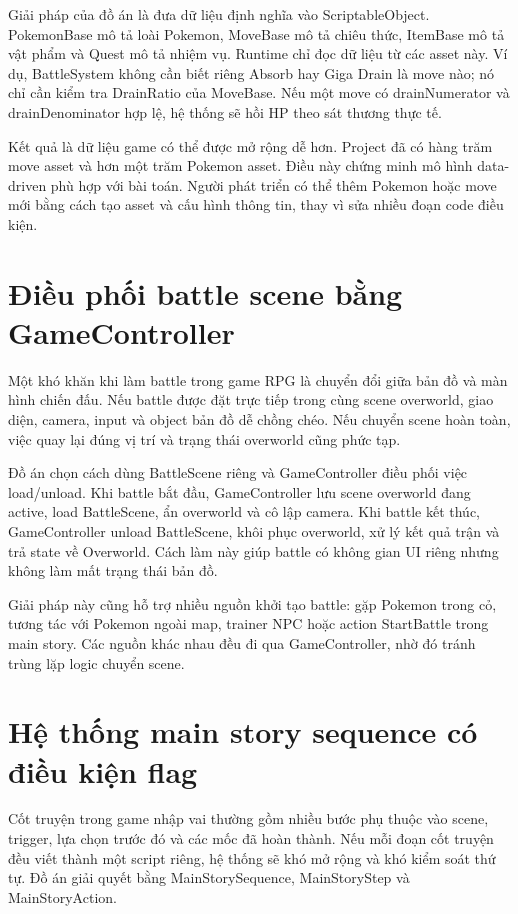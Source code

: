 Giải pháp của đồ án là đưa dữ liệu định nghĩa vào ScriptableObject. PokemonBase mô tả loài Pokemon, MoveBase mô tả chiêu thức, ItemBase mô tả vật phẩm và Quest mô tả nhiệm vụ. Runtime chỉ đọc dữ liệu từ các asset này. Ví dụ, BattleSystem không cần biết riêng Absorb hay Giga Drain là move nào; nó chỉ cần kiểm tra DrainRatio của MoveBase. Nếu một move có drainNumerator và drainDenominator hợp lệ, hệ thống sẽ hồi HP theo sát thương thực tế.

Kết quả là dữ liệu game có thể được mở rộng dễ hơn. Project đã có hàng trăm move asset và hơn một trăm Pokemon asset. Điều này chứng minh mô hình data-driven phù hợp với bài toán. Người phát triển có thể thêm Pokemon hoặc move mới bằng cách tạo asset và cấu hình thông tin, thay vì sửa nhiều đoạn code điều kiện.

\section{Điều phối battle scene bằng GameController}

Một khó khăn khi làm battle trong game RPG là chuyển đổi giữa bản đồ và màn hình chiến đấu. Nếu battle được đặt trực tiếp trong cùng scene overworld, giao diện, camera, input và object bản đồ dễ chồng chéo. Nếu chuyển scene hoàn toàn, việc quay lại đúng vị trí và trạng thái overworld cũng phức tạp.

Đồ án chọn cách dùng BattleScene riêng và GameController điều phối việc load/unload. Khi battle bắt đầu, GameController lưu scene overworld đang active, load BattleScene, ẩn overworld và cô lập camera. Khi battle kết thúc, GameController unload BattleScene, khôi phục overworld, xử lý kết quả trận và trả state về Overworld. Cách làm này giúp battle có không gian UI riêng nhưng không làm mất trạng thái bản đồ.

Giải pháp này cũng hỗ trợ nhiều nguồn khởi tạo battle: gặp Pokemon trong cỏ, tương tác với Pokemon ngoài map, trainer NPC hoặc action StartBattle trong main story. Các nguồn khác nhau đều đi qua GameController, nhờ đó tránh trùng lặp logic chuyển scene.

\section{Hệ thống main story sequence có điều kiện flag}

Cốt truyện trong game nhập vai thường gồm nhiều bước phụ thuộc vào scene, trigger, lựa chọn trước đó và các mốc đã hoàn thành. Nếu mỗi đoạn cốt truyện đều viết thành một script riêng, hệ thống sẽ khó mở rộng và khó kiểm soát thứ tự. Đồ án giải quyết bằng MainStorySequence, MainStoryStep và MainStoryAction.

